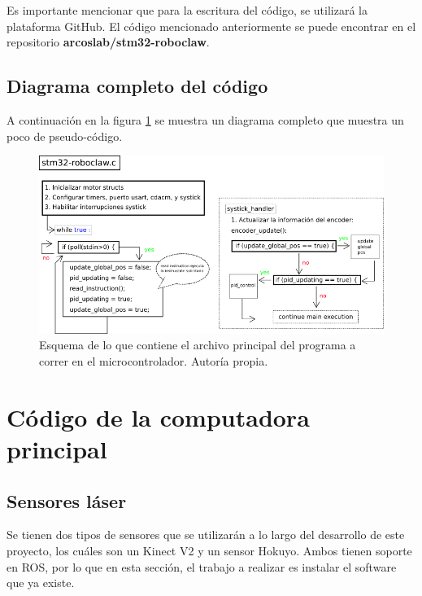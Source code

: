 Es importante mencionar que para la escritura del código, se utilizará la plataforma GitHub. El código mencionado anteriormente se puede encontrar en el repositorio \textbf{arcoslab/stm32-roboclaw}.

\subsection{Diagrama completo del código}
A continuación en la figura \ref{F:main} se muestra un diagrama completo que muestra un poco de pseudo-código.

\begin{figure}[H]
\centering
%
%
\includegraphics[scale=0.8]{imagenes/diagrama_main.png}
\caption{Esquema de lo que contiene el archivo principal del programa a correr en el microcontrolador. Autoría propia.}
\label{F:main}
\end{figure}

\newpage

\section{Código de la computadora principal}



\subsection{Sensores láser}

Se tienen dos tipos de sensores que se utilizarán a lo largo del desarrollo de este proyecto, los cuáles son un Kinect V2 y un sensor Hokuyo. Ambos tienen soporte en ROS, por lo que en esta sección, el trabajo a realizar es instalar el software que ya existe.

